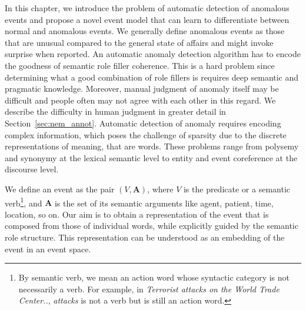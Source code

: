 In this chapter, we introduce the problem of automatic detection of anomalous events
and propose a novel event model that can learn to differentiate
between normal
and anomalous events. We generally define anomalous events as those that are
unusual compared
to the general state of affairs and might invoke surprise when reported. An 
automatic
anomaly detection algorithm has to encode
the goodness of semantic role filler coherence.  This is a hard problem since
determining what a good combination of role fillers is 
requires deep semantic and pragmatic knowledge.  
Moreover, manual judgment of anomaly itself may be difficult and people often
may not agree with each other in this
regard.  We describe the difficulty in human judgment in greater detail in
Section~\ref{sec:nem_annot}.  
Automatic detection of anomaly requires encoding complex information, which
poses the challenge of sparsity
due to the discrete representations of meaning, that are words.  These problems
range from polysemy and synonymy at the 
lexical semantic level to entity and event coreference at the discourse level.

We define an event as the pair $(V, \textbf{A})$, where $V$
is the predicate or a semantic verb\footnote{By semantic verb, we mean an action 
word whose
syntactic category is not necessarily a verb.  
For example, in \textit{Terrorist attacks on the World Trade Center..},
\textit{attacks} is not a verb but is still an 
action word.}, and $\textbf{A}$ is the set of its semantic arguments like agent,
patient, time, location, so on. Our aim
is to obtain a representation of the event that is composed from
those of individual words, while explicitly guided by the semantic
role structure. This representation can be understood as an embedding of the
event in an event space. 

